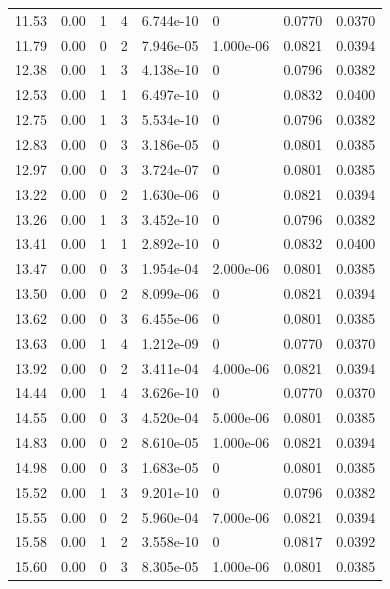 \documentclass[preview]{standalone}
\begin{document}
{{{\begin{tabular}{L{1.2cm}C{1.2cm} C{0.3cm}C{0.5cm} C{1.4cm}C{1.4cm} C{1.4cm}C{1.4cm}}
  11.53  &  0.00  & 1     &  4 &  6.744e-10  & 0  & 0.0770 &  0.0370   \\ 
  11.79  &  0.00  & 0     &  2 &  7.946e-05  & 1.000e-06  & 0.0821 &  0.0394   \\ 
  12.38  &  0.00  & 1     &  3 &  4.138e-10  & 0  & 0.0796 &  0.0382   \\ 
  12.53  &  0.00  & 1     &  1 &  6.497e-10  & 0  & 0.0832 &  0.0400   \\ 
  12.75  &  0.00  & 1     &  3 &  5.534e-10  & 0  & 0.0796 &  0.0382   \\ 
  12.83  &  0.00  & 0     &  3 &  3.186e-05  & 0  & 0.0801 &  0.0385   \\ 
  12.97  &  0.00  & 0     &  3 &  3.724e-07  & 0  & 0.0801 &  0.0385   \\ 
  13.22  &  0.00  & 0     &  2 &  1.630e-06  & 0  & 0.0821 &  0.0394   \\ 
  13.26  &  0.00  & 1     &  3 &  3.452e-10  & 0  & 0.0796 &  0.0382   \\ 
  13.41  &  0.00  & 1     &  1 &  2.892e-10  & 0  & 0.0832 &  0.0400   \\ 
  13.47  &  0.00  & 0     &  3 &  1.954e-04  & 2.000e-06  & 0.0801 &  0.0385   \\ 
  13.50  &  0.00  & 0     &  2 &  8.099e-06  & 0  & 0.0821 &  0.0394   \\ 
  13.62  &  0.00  & 0     &  3 &  6.455e-06  & 0  & 0.0801 &  0.0385   \\ 
  13.63  &  0.00  & 1     &  4 &  1.212e-09  & 0  & 0.0770 &  0.0370   \\ 
  13.92  &  0.00  & 0     &  2 &  3.411e-04  & 4.000e-06  & 0.0821 &  0.0394   \\ 
  14.44  &  0.00  & 1     &  4 &  3.626e-10  & 0  & 0.0770 &  0.0370   \\ 
  14.55  &  0.00  & 0     &  3 &  4.520e-04  & 5.000e-06  & 0.0801 &  0.0385   \\ 
  14.83  &  0.00  & 0     &  2 &  8.610e-05  & 1.000e-06  & 0.0821 &  0.0394   \\ 
  14.98  &  0.00  & 0     &  3 &  1.683e-05  & 0  & 0.0801 &  0.0385   \\ 
  15.52  &  0.00  & 1     &  3 &  9.201e-10  & 0  & 0.0796 &  0.0382   \\ 
  15.55  &  0.00  & 0     &  2 &  5.960e-04  & 7.000e-06  & 0.0821 &  0.0394   \\ 
  15.58  &  0.00  & 1     &  2 &  3.558e-10  & 0  & 0.0817 &  0.0392   \\ 
  15.60  &  0.00  & 0     &  3 &  8.305e-05  & 1.000e-06  & 0.0801 &  0.0385   \\ 

\end{tabular}}}}
\end{document}
